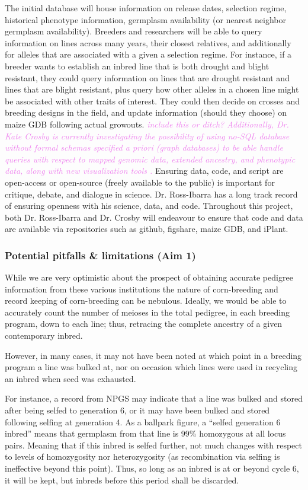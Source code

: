 \documentclass[12pt]{article}
\newcommand{\kc}[1]{\textcolor{violet}{ \emph{\scriptsize  #1}} }
\begin{document}
{The initial database will house information on release dates, selection regime, historical phenotype information, germplasm availability (or nearest neighbor germplasm availability).
Breeders and researchers will be able to query information on lines across many years, their closest relatives, and additionally for alleles that are associated with a given a selection regime. 
For instance, if a breeder wants to establish an inbred line that is both drought and blight resistant, they could query information on lines that are drought resistant and lines that are blight resistant, plus query how other alleles in a chosen line might be associated with other traits of interest. They could then decide on crosses and breeding designs in the field, and update information (should they choose) on maize GDB following actual growouts.
\kc{include this or ditch? Additionally, Dr. Kate Crosby is currently investigating the possibility of using no-SQL database without formal schemas specified \textit{a priori} (graph databases) to be able handle queries with respect to mapped genomic data, extended ancestry, and phenotypic data, along with new visualization tools \citep{ParejaTobes:2015bf}.}
Ensuring data, code, and script are open-access or open-source (freely available to the public) is important for critique, debate, and dialogue in science. Dr. Ross-Ibarra has a long track record of ensuring openness with his science, data, and code. Throughout this project, both Dr. Ross-Ibarra and Dr. Crosby will endeavour to ensure that code and data are available via repositories such as github, figshare, maize GDB, and iPlant.


\subsubsection*{Potential pitfalls \& limitations (Aim 1)}
While we are very optimistic about the prospect of obtaining accurate pedigree information from these various institutions the nature of corn-breeding and record keeping of corn-breeding can be nebulous. 
Ideally, we would be able to accurately count the number of meioses in the total pedigree, in each breeding program, down to each line; thus, retracing the complete ancestry of a given contemporary inbred. 

However, in many cases, it may not have been noted at which point in a breeding program a line was bulked at, nor on occasion which lines were used in recycling an inbred when seed was exhausted. 

For instance, a record from NPGS may indicate that a line was bulked and stored after being selfed to generation 6, or it may have been bulked and stored following selfing at generation 4. As a ballpark figure, a ``selfed generation 6 inbred'' means that germplasm from that line is 99\% homozygous at all locus pairs. 
Meaning that if this inbred is selfed further, not much changes with respect to levels of homozygosity nor heterozygosity (as recombination via selfing is ineffective beyond this point).  
Thus, so long as an inbred is at or beyond cycle 6, it will be kept, but inbreds before this period shall be discarded.

}
\end{document}
